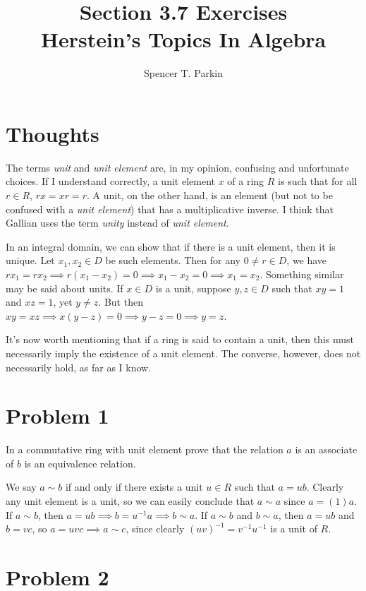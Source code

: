\documentclass[12pt]{article}
\title{Section 3.7 Exercises\\Herstein's Topics In Algebra}
\author{Spencer T. Parkin}
\begin{document}
\maketitle

\section*{Thoughts}

The terms {\it unit} and {\it unit element} are, in my opinion, confusing and unfortunate choices.
If I understand correctly, a unit element $x$ of a ring $R$ is such that for all $r\in R$, $rx=xr=r$.
A unit, on the other hand, is an element (but not to be confused with a {\it unit element}) that
has a multiplicative inverse.  I think that Gallian uses the term {\it unity} instead of {\it unit element}.

In an integral domain, we can show that if there is a unit element,
then it is unique.  Let $x_1,x_2\in D$ be such elements.  Then for
any $0\neq r\in D$, we have $rx_1=rx_2\implies r(x_1-x_2)=0\implies x_1-x_2=0\implies x_1=x_2$.
Something similar may be said about units.  If $x\in D$ is a unit, suppose $y,z\in D$
such that $xy=1$ and $xz=1$, yet $y\neq z$.  But then $xy=xz\implies x(y-z)=0\implies y-z=0\implies y=z$.

It's now worth mentioning that if a ring is said to contain a unit, then this must necessarily imply the
existence of a unit element.  The converse, however, does not necessarily hold, as far as I know.

\section*{Problem 1}

In a commutative ring with unit element prove that the relation $a$ is an associate of $b$ is an equivalence relation.

We say $a\sim b$ if and only if there exists a unit $u\in R$ such that $a=ub$.
Clearly any unit element is a unit, so we can easily conclude that $a\sim a$ since $a=(1)a$.
If $a\sim b$, then $a=ub\implies b=u^{-1}a\implies b\sim a$.
If $a\sim b$ and $b\sim a$, then $a=ub$ and $b=vc$, so $a=uvc\implies a\sim c$,
since clearly $(uv)^{-1}=v^{-1}u^{-1}$ is a unit of $R$.

\section*{Problem 2}
\end{document}
